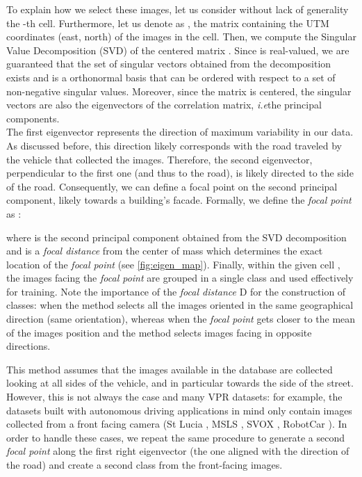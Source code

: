 \documentclass[10pt,twocolumn,letterpaper]{article}
\def\ie{\emph{i.e}\onedot}
\begin{document}
To explain how we select these images, let us consider without lack of generality the -th cell. 
Furthermore, let us denote as , the matrix containing the UTM coordinates (east, north) of the  images in the cell. 
Then, we compute the Singular Value Decomposition (SVD)  of the centered matrix .
Since  is real-valued, we are guaranteed that the set of singular vectors obtained from the decomposition exists and is a orthonormal basis that can be ordered with respect to a set of non-negative singular values. Moreover, since the matrix is centered, the singular vectors are also the eigenvectors of the correlation matrix, \ie the principal components.\\
The first eigenvector represents the direction of maximum variability in our data. As discussed before, this direction likely corresponds with the road traveled by the vehicle that collected the images.
Therefore, the second eigenvector, perpendicular to the first one (and thus to the road), is likely directed to the side of the road.
Consequently, we can define a focal point on the second principal component, likely towards a building's facade.
Formally, we define the \textit{focal point}  as :

where  is the second principal component obtained from the SVD decomposition and  is a \textit{focal distance} from the center of mass which determines the exact location of the \textit{focal point} (see \cref{fig:eigen_map}).
Finally, within the given cell , the images facing the \textit{focal point}  are grouped in a single class and used effectively for training.
Note the importance of the \textit{focal distance} D for the construction of classes: when  the method selects all the images oriented in the same geographical direction (same orientation), whereas when  the \textit{focal point} gets closer to the mean of the images position and the method selects images facing in opposite directions.


This method assumes that the images available in the database are collected looking at all sides of the vehicle, and in particular towards the side of the street. However, this is not always the case and many VPR datasets: for example, the datasets built with autonomous driving applications in mind only contain images collected from a front facing camera (St Lucia \cite{Milford_2008_st_lucia}, MSLS \cite{Warburg_2020_msls}, SVOX \cite{Berton_2021_svox}, RobotCar \cite{Maddern_2017_robotCar}).
In order to handle these cases, we repeat the same procedure to generate a second \textit{focal point} along the first right eigenvector (the one aligned with the direction of the road) and create a second class from the front-facing images.
\end{document}
